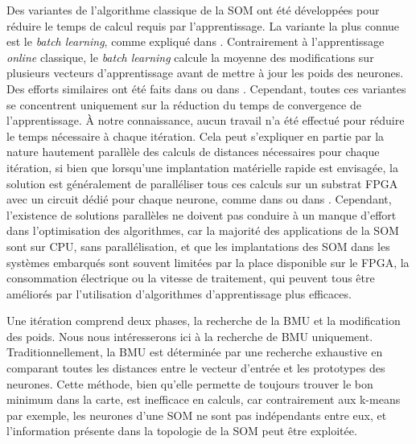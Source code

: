 	Des variantes de l'algorithme classique de la SOM ont été développées pour réduire le temps de calcul requis par l'apprentissage. La variante la plus connue est le \textit{batch learning}, comme expliqué dans \cite{cottrell2018self}. Contrairement à l'apprentissage \textit{online} classique, le \textit{batch learning} calcule la moyenne des modifications sur plusieurs vecteurs d'apprentissage avant de mettre à jour les poids des neurones. Des efforts similaires ont été faits dans \cite{fiannaca2013simulated} ou dans \cite{oyana2012new}. Cependant, toutes ces variantes se concentrent uniquement sur la réduction du temps de convergence de l'apprentissage. À notre connaissance, aucun travail n'a été effectué pour réduire le temps nécessaire à chaque itération. Cela peut s'expliquer en partie par la nature hautement parallèle des calculs de distances nécessaires pour chaque itération, si bien que lorsqu'une implantation matérielle rapide est envisagée, la solution est généralement de paralléliser tous ces calculs sur un substrat FPGA avec un circuit dédié pour chaque neurone, comme dans \cite{abadi2018scalable} ou dans \cite{huang2017hardware}. Cependant, l'existence de solutions parallèles ne doivent pas conduire à un manque d'effort dans l'optimisation des algorithmes, car la majorité des applications de la SOM sont sur CPU, sans parallélisation, et que les implantations des SOM dans les systèmes embarqués sont souvent limitées par la place disponible sur le FPGA, la consommation électrique ou la vitesse de traitement, qui peuvent tous être améliorés par l'utilisation d'algorithmes d'apprentissage plus efficaces.

	Une itération comprend deux phases, la recherche de la BMU et la modification des poids. Nous nous intéresserons ici à la recherche de BMU uniquement. Traditionnellement, la BMU est déterminée par une recherche exhaustive en comparant toutes les distances entre le vecteur d'entrée et les prototypes des neurones. Cette méthode, bien qu'elle permette de toujours trouver le bon minimum dans la carte, est inefficace en calculs, car contrairement aux k-means par exemple, les neurones d'une SOM ne sont pas indépendants entre eux, et l'information présente dans la topologie de la SOM peut être exploitée. 
	
